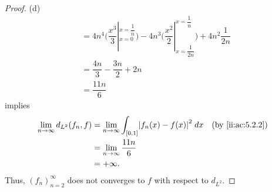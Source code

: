 \begin{proof}{(d)}
\begin{align*}
     & = 4n^4 \bigg(\dfrac{x^3}{3}|_{x = 0}^{x = \dfrac{1}{n}}\bigg) - 4n^3 \bigg(\dfrac{x^2}{2}|_{x = \dfrac{1}{2n}}^{x = \dfrac{1}{n}}\bigg) + 4n^2 \dfrac{1}{2n} \\
     & = \dfrac{4n}{3} - \dfrac{3n}{2} + 2n                                                                                                                         \\
     & = \dfrac{11n}{6}
  \end{align*}
  implies
  \begin{align*}
    \lim_{n \to \infty} d_{L^2}(f_n, f) & = \lim_{n \to \infty} \int_{[0, 1]} \abs{f_n(x) - f(x)}^2 \; dx &  & \by{ii:ac:5.2.2} \\
                                        & = \lim_{n \to \infty} \dfrac{11n}{6}                                                  \\
                                        & = +\infty.
  \end{align*}
  Thus, \((f_n)_{n = 2}^\infty\) does not converges to \(f\) with respect to \(d_{L^2}\).
\end{proof}

